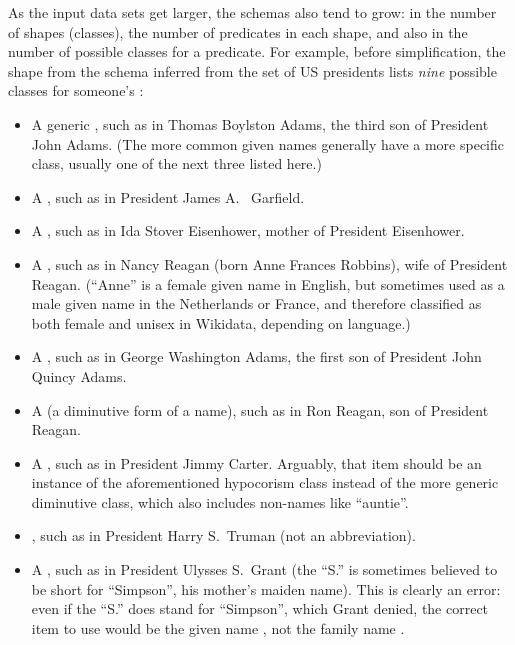 As the input data sets get larger,
the \glspl{schema} also tend to grow:
in the number of \glspl{shape} (classes),
the number of \glspl{predicate} in each \gls{shape},
and also in the number of possible classes for a predicate.
For example, before simplification,
the  \gls{shape} from the \gls{schema} inferred from the set of US presidents
lists \emph{nine} possible classes for someone’s :
\begin{itemize}
\item A generic ,
  such as  in Thomas Boylston Adams, the third son of President John Adams.
  (The more common given names generally have a more specific class,
  usually one of the next three listed here.)
\item A ,
  such as  in President James A.~ Garfield.
\item A ,
  such as  in Ida Stover Eisenhower, mother of President Eisenhower.
\item A ,
  such as  in Nancy Reagan (born Anne Frances Robbins), wife of President Reagan.
  (“Anne” is a female given name in English,
  but sometimes used as a male given name in the Netherlands or France,
  and therefore classified as both female and unisex in \gls{Wikidata}, depending on language.)
\item A ,
  such as  in George Washington Adams, the first son of President John Quincy Adams.
\item A  (a diminutive form of a name),
  such as  in Ron Reagan, son of President Reagan.
\item A ,
  such as  in President Jimmy Carter.
  Arguably, that \gls{item} should be an instance of the aforementioned hypocorism class
  instead of the more generic diminutive class, which also includes non-names like “auntie”.
\item {},
  such as  in President Harry S.~Truman (not an abbreviation).
\item A ,
  such as  in President Ulysses S.~Grant
  (the “S.” is sometimes believed to be short for “Simpson”, his mother’s maiden name).
  This is clearly an error: even if the “S.” does stand for “Simpson”, which Grant denied,
  the correct \gls{item} to use would be the given name , not the family name .
\end{itemize}

